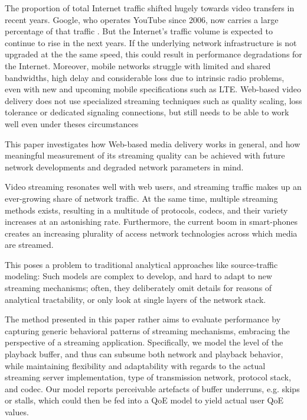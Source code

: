 The proportion of total Internet traffic shifted hugely towards video transfers in recent years. Google, who operates YouTube since 2006, now carries a large percentage of that traffic \cite{nw2010carrier}. But the Internet's traffic volume is expected to continue to rise in the next years. If the underlying network infrastructure is not upgraded at the the same speed, this could result in performance degradations for the Internet. Moreover, mobile networks struggle with limited and shared bandwidths, high delay and considerable loss due to intrinsic radio problems, even with new and upcoming mobile specifications such as LTE. Web-based video delivery does not use specialized streaming techniques such as quality scaling, loss tolerance or dedicated signaling connections, but still needs to be able to work well even under theses circumstances

This paper investigates how Web-based media delivery works in general, and how meaningful measurement of its streaming quality can be achieved with future network developments and degraded network parameters in mind.



Video streaming resonates well with web users, and streaming traffic makes up an ever-growing share of network traffic. At the same time, multiple streaming methods exists, resulting in a multitude of protocols, codecs, and their variety increases at an astonishing rate. Furthermore, the current boom in smart-phones creates an increasing plurality of access network technologies across which media are streamed.

This poses a problem to traditional analytical approaches like source-traffic modeling: Such models are complex to develop, and hard to adapt to new streaming mechanisms; often, they deliberately omit details for reasons of analytical tractability, or only look at single layers of the network stack.

The method presented in this paper rather aims to evaluate performance by capturing generic behavioral patterns of streaming mechanisms, embracing the perspective of a streaming application. Specifically, we model the level of the playback buffer, and thus can subsume both network and playback behavior, while maintaining flexibility and adaptability with regards to the actual streaming server implementation, type of transmission network, protocol stack, and codec. Our model reports perceivable artefacts of buffer underruns, e.g. skips or stalls, which could then be fed into a QoE model to yield actual user QoE values.



